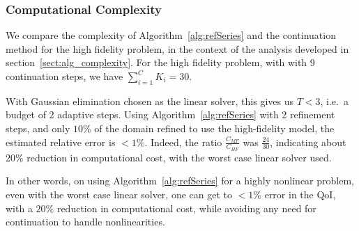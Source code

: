 \subsubsection{Computational Complexity}
%
We compare the complexity of Algorithm~\ref{alg:refSeries} and the continuation method for the high fidelity problem, in the context of the analysis developed in section~\ref{sect:alg_complexity}. For the high fidelity problem, with  with 9 continuation steps, we have $\sum\limits_{i=1}^{C} K_i=30$. 
 
With Gaussian elimination chosen as the linear solver, this gives us $T < 3$, i.e.\ a budget of 2 adaptive steps. Using Algorithm~\ref{alg:refSeries} with 2 refinement steps, and only $10\%$ of the domain refined to use the high-fidelity model, the estimated relative error is $<1\%$. Indeed, the ratio $\frac{C_{MF}}{C_{HF}}$ was $\frac{24}{30}$, indicating about $20\%$ reduction in computational cost, with the worst case linear solver used. 

In other words, on using Algorithm~\ref{alg:refSeries} for a highly nonlinear problem, even with the worst case linear solver, one can get to $<1\%$ error in the QoI, with a $20\%$ reduction in computational cost, while avoiding any need for continuation to handle nonlinearities. 
